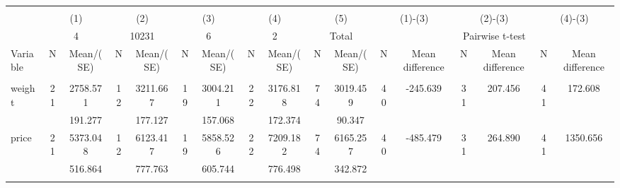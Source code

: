 \begin{tabular}{@{\extracolsep{5pt}}lcccccccccccccccc}
\\[-1.8ex]\hline \hline \\[-1.8ex]
 & \multicolumn{2}{c}{(1)}  & \multicolumn{2}{c}{(2)}  & \multicolumn{2}{c}{(3)}  & \multicolumn{2}{c}{(4)}  & \multicolumn{2}{c}{(5)}  & \multicolumn{2}{c}{(1)-(3)} & \multicolumn{2}{c}{(2)-(3)} & \multicolumn{2}{c}{(4)-(3)} \\
 & \multicolumn{2}{c}{4}  & \multicolumn{2}{c}{10231}  & \multicolumn{2}{c}{6}  & \multicolumn{2}{c}{2}  & \multicolumn{2}{c}{Total}  & \multicolumn{6}{c}{Pairwise t-test}  \\
Variable & N & Mean/(SE) & N & Mean/(SE) & N & Mean/(SE) & N & Mean/(SE) & N & Mean/(SE) & N & Mean difference & N & Mean difference & N & Mean difference \\ \hline \\[-1.8ex] 
weight   & 21    &  2758.571    & 12    &  3211.667    & 19    &  3004.211    & 22    &  3176.818    & 74    &  3019.459    & 40    &  -245.639    & 31    &   207.456    & 41    &   172.608   \\
 &   &   191.277  &   &   177.127  &   &   157.068  &   &   172.374  &   &    90.347  &   &  &   &  &   &   \\
price   & 21    &  5373.048    & 12    &  6123.417    & 19    &  5858.526    & 22    &  7209.182    & 74    &  6165.257    & 40    &  -485.479    & 31    &   264.890    & 41    &  1350.656   \\
 &   &   516.864  &   &   777.763  &   &   605.744  &   &   776.498  &   &   342.872  &   &  &   &  &   &   \\
\hline \\[-1.8ex]

\end{tabular}
